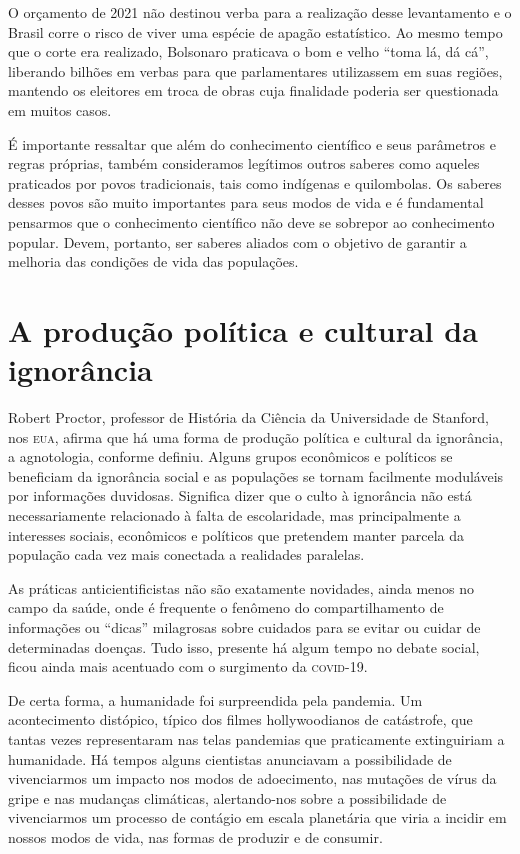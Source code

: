 O orçamento de 2021 não destinou verba para a realização desse
levantamento e o Brasil corre o risco de viver uma espécie de apagão
estatístico. Ao mesmo tempo que o corte era realizado, Bolsonaro
praticava o bom e velho ``toma lá, dá cá'', liberando bilhões em verbas
para que parlamentares utilizassem em suas regiões, mantendo os
eleitores em troca de obras cuja finalidade poderia ser questionada em
muitos casos.

É importante ressaltar que além do conhecimento científico e seus
parâmetros e regras próprias, também consideramos legítimos outros
saberes como aqueles praticados por povos tradicionais, tais como
indígenas e quilombolas. Os saberes desses povos são muito importantes
para seus modos de vida e é fundamental pensarmos que o conhecimento
científico não deve se sobrepor ao conhecimento popular. Devem,
portanto, ser saberes aliados com o objetivo de garantir a melhoria das
condições de vida das populações.

\section{A produção política e cultural da ignorância}

Robert Proctor, professor de História da Ciência da Universidade de
Stanford, nos \textsc{eua}, afirma que há uma forma de produção política e
cultural da ignorância, a agnotologia, conforme definiu. Alguns grupos
econômicos e políticos se beneficiam da ignorância social e as
populações se tornam facilmente moduláveis por informações duvidosas.
Significa dizer que o culto à ignorância não está necessariamente
relacionado à falta de escolaridade, mas principalmente a interesses
sociais, econômicos e políticos que pretendem manter parcela da
população cada vez mais conectada a realidades paralelas.

As práticas anticientificistas não são exatamente novidades, ainda menos
no campo da saúde, onde é frequente o fenômeno do compartilhamento de
informações ou ``dicas'' milagrosas sobre cuidados para se evitar ou
cuidar de determinadas doenças. Tudo isso, presente há algum tempo no
debate social, ficou ainda mais acentuado com o surgimento da \textsc{covid-19}.

De certa forma, a humanidade foi surpreendida pela pandemia. Um
acontecimento distópico, típico dos filmes hollywoodianos de catástrofe,
que tantas vezes representaram nas telas pandemias que praticamente
extinguiriam a humanidade. Há tempos alguns cientistas anunciavam a
possibilidade de vivenciarmos um impacto nos modos de adoecimento, nas
mutações de vírus da gripe e nas mudanças climáticas, alertando-nos
sobre a possibilidade de vivenciarmos um processo de contágio em escala
planetária que viria a incidir em nossos modos de vida, nas formas de
produzir e de consumir.

